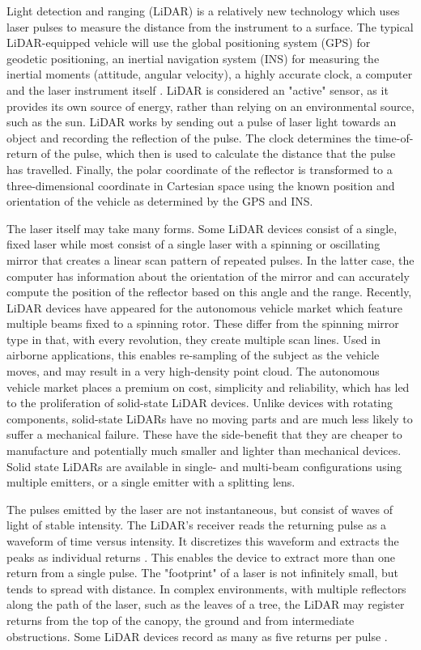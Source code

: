 \documentclass[10pt]{article}
\begin{document}
Light detection and ranging (LiDAR) is a relatively new technology which uses laser pulses to measure the distance from the instrument to a surface. The typical LiDAR-equipped vehicle will use the global positioning system (GPS) for geodetic positioning, an inertial navigation system (INS) for measuring the inertial moments (attitude, angular velocity), a highly accurate clock, a computer and the laser instrument itself \cite{May2007,Lillesand1999}. LiDAR is considered an "active" sensor, as it provides its own source of energy, rather than relying on an environmental source, such as the sun. LiDAR works by sending out a pulse of laser light towards an object and recording the reflection of the pulse. The clock determines the time-of-return of the pulse, which then is used to calculate the distance that the pulse has travelled. Finally, the polar coordinate of the reflector is transformed to a three-dimensional coordinate in Cartesian space using the known position and orientation of the vehicle as determined by the GPS and INS. 

The laser itself may take many forms. Some LiDAR devices consist of a single, fixed laser while most consist of a single laser with a spinning or oscillating mirror that creates a linear scan pattern of repeated pulses. In the latter case, the computer has information about the orientation of the mirror and can accurately compute the position of the reflector based on this angle and the range. Recently, LiDAR devices have appeared for the autonomous vehicle market which feature multiple beams fixed to a spinning rotor. These differ from the spinning mirror type in that, with every revolution, they create multiple scan lines. Used in airborne applications, this enables re-sampling of the subject as the vehicle moves, and may result in a very high-density point cloud. The autonomous vehicle market places a premium on cost, simplicity and reliability, which has led to the proliferation of solid-state LiDAR devices. Unlike devices with rotating components, solid-state LiDARs have no moving parts and are much less likely to suffer a mechanical failure. These have the side-benefit that they are cheaper to manufacture and potentially much smaller and lighter than mechanical devices. Solid state LiDARs are available in single- and multi-beam configurations using multiple emitters, or a single emitter with a splitting lens.

The pulses emitted by the laser are not instantaneous, but consist of waves of light of stable intensity. The LiDAR's receiver reads the returning pulse as a waveform of time versus intensity. It discretizes this waveform and extracts the peaks as individual returns \cite{Lillesand1999}. This enables the device to extract more than one return from a single pulse. The "footprint" of a laser is not infinitely small, but tends to spread with distance. In complex environments, with multiple reflectors along the path of the laser, such as the leaves of a tree, the LiDAR may register returns from the top of the canopy, the ground and from intermediate obstructions. Some LiDAR devices record as many as five returns per pulse \cite{Lillesand1999}.
\end{document}
